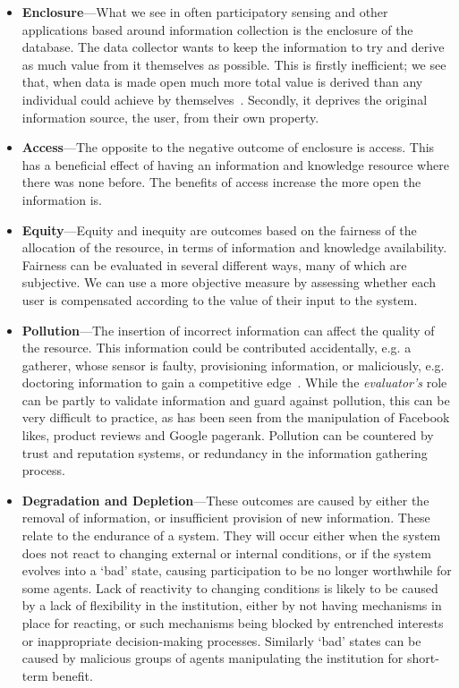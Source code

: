\begin{itemize}

\item \textbf{Enclosure}---What we see in often participatory sensing and other applications based around information collection is the enclosure of the database. 
The data collector wants to keep the information to try and derive as much value from it themselves as possible. 
This is firstly inefficient; we see that, when data is made open much more total value is derived than any individual could achieve by themselves~\citep{Shadbolt2012}. 
Secondly, it deprives the original information source, the user, from their own property. 

\item \textbf{Access}---The opposite to the negative outcome of enclosure is access. 
This has a beneficial effect of having an information and knowledge resource where there was none before. 
The benefits of access increase the more open the information is.

\item \textbf{Equity}---Equity and inequity are outcomes based on the fairness of the allocation of the resource, in terms of information and knowledge availability. Fairness can be evaluated in several different ways, many of which are subjective. We can use a more objective measure by assessing whether each user is compensated according to the value of their input to the system. 


\item \textbf{Pollution}---The insertion of incorrect information can affect the quality of the resource. 
This information could be contributed accidentally, e.g. a gatherer, whose sensor is faulty, provisioning information, or maliciously, e.g. doctoring information to gain a competitive edge~\citep{Oreskes2010}. While the \emph{evaluator's} role can be partly to validate information and guard against pollution, this can be very difficult to practice, as has been seen from the manipulation of Facebook likes, product reviews and Google pagerank. %
Pollution can be countered by trust and reputation systems, or redundancy in the information gathering process.

\item \textbf{Degradation and Depletion}---These outcomes are caused by either the removal of information, or insufficient provision of new information. 
These relate to the endurance of a system. They will occur either when the system does not react to changing external or internal conditions,  or if the system evolves into a `bad' state, causing participation to be no longer worthwhile for some agents. 
Lack of reactivity to changing conditions is likely to be caused by a lack of flexibility in the institution, either by not having mechanisms in place for reacting, or such mechanisms being blocked by entrenched interests or inappropriate decision-making processes. 
Similarly `bad' states can be caused by malicious groups of agents manipulating the institution for short-term benefit.


\end{itemize}
